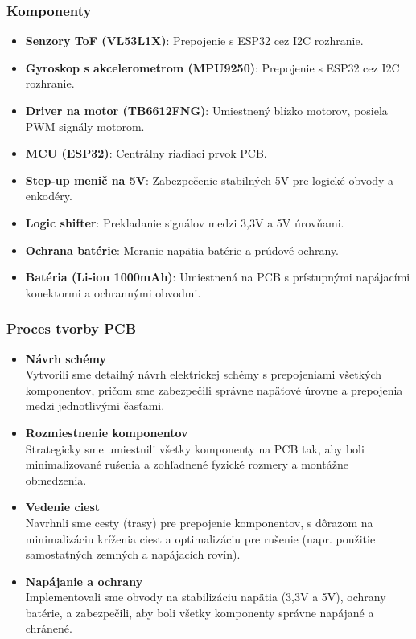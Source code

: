 \subsubsection{Komponenty}
\begin{itemize}
	\item \textbf{Senzory ToF (VL53L1X)}: Prepojenie s ESP32 cez I2C rozhranie.
	\item \textbf{Gyroskop s akcelerometrom (MPU9250)}: Prepojenie s ESP32 cez I2C rozhranie.
	\item \textbf{Driver na motor (TB6612FNG)}: Umiestnený blízko motorov, posiela PWM signály motorom.
	\item \textbf{MCU (ESP32)}: Centrálny riadiaci prvok PCB.
	\item \textbf{Step-up menič na 5V}: Zabezpečenie stabilných 5V pre logické obvody a enkodéry.
	\item \textbf{Logic shifter}: Prekladanie signálov medzi 3,3V a 5V úrovňami.
	\item \textbf{Ochrana batérie}: Meranie napätia batérie a prúdové ochrany.
	\item \textbf{Batéria (Li-ion 1000mAh)}: Umiestnená na PCB s prístupnými napájacími konektormi a ochrannými obvodmi.
\end{itemize}

\subsubsection{Proces tvorby PCB}
\begin{itemize}

\item \textbf{Návrh schémy}\\
Vytvorili sme detailný návrh elektrickej schémy s prepojeniami všetkých komponentov, pričom sme zabezpečili správne napäťové úrovne a prepojenia medzi jednotlivými časťami.

\item \textbf{Rozmiestnenie komponentov}\\
Strategicky sme umiestnili všetky komponenty na PCB tak, aby boli minimalizované rušenia a zohľadnené fyzické rozmery a montážne obmedzenia.

\item \textbf{Vedenie ciest}\\
Navrhnli sme cesty (trasy) pre prepojenie komponentov, s dôrazom na minimalizáciu kríženia ciest a optimalizáciu pre rušenie (napr. použitie samostatných zemných a napájacích rovín).

\item \textbf{Napájanie a ochrany}\\
Implementovali sme obvody na stabilizáciu napätia (3,3V a 5V), ochrany batérie, a zabezpečili, aby boli všetky komponenty správne napájané a chránené.
 
\end{itemize}

